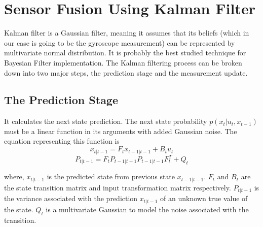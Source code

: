 \documentclass[journal,twoside]{IEEEtran}
\begin{document}
\section{Sensor Fusion Using Kalman Filter}
\noindent Kalman filter is a Gaussian filter, meaning it assumes that its beliefs (which in our case is going to be the gyroscope measurement) can be represented by multivariate normal distribution. It is probably the best studied technique for Bayesian Filter implementation. The Kalman filtering process can be broken down into two major steps, the prediction stage and the measurement update.
\subsection{The Prediction Stage}
\noindent It calculates the next state prediction. The next state probability $p(x_t|u_t, x_{t-1})$ must be a linear function in its arguments with added Gaussian noise. The equation representing this function is
\begin{equation}
x_{t|t-1} = F_t x_{t-1|t-1} + B_t u_t
\end{equation} 
\begin{equation}
P_{t|t-1} = F_t P_{t-1|t−1} P_{t-1|t-1} F_t^T + Q_t
\end{equation} 
\par\noindent where,\newline
$x_{t|t-1}$ is the predicted state from previous state $x_{t-1|t-1}$.\newline
$F_t$ and $B_t$ are the state transition matrix and input transformation matrix respectively.\newline
$P_{t|t-1}$ is the variance associated with the prediction $x_{t|t-1}$ of an unknown true value of the state.\newline
$Q_t$ is a multivariate Gaussian to model the noise associated with the transition.\newline
\end{document}
